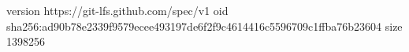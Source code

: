 version https://git-lfs.github.com/spec/v1
oid sha256:ad90b78e2339f9579ecee493197de6f2f9c4614416c5596709c1ffba76b23604
size 1398256
